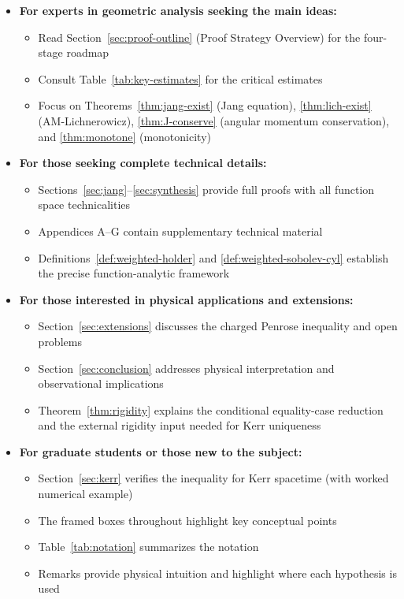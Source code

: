 \begin{itemize}[leftmargin=1.5em]
    \item \textbf{For experts in geometric analysis seeking the main ideas:}
    \begin{itemize}
        \item Read Section~\ref{sec:proof-outline} (Proof Strategy Overview) for the four-stage roadmap
        \item Consult Table~\ref{tab:key-estimates} for the critical estimates
        \item Focus on Theorems~\ref{thm:jang-exist} (Jang equation), \ref{thm:lich-exist} (AM-Lichnerowicz), \ref{thm:J-conserve} (angular momentum conservation), and \ref{thm:monotone} (monotonicity)
    \end{itemize}
    
    \item \textbf{For those seeking complete technical details:}
    \begin{itemize}
        \item Sections~\ref{sec:jang}--\ref{sec:synthesis} provide full proofs with all function space technicalities
        \item Appendices A--G contain supplementary technical material
        \item Definitions~\ref{def:weighted-holder} and \ref{def:weighted-sobolev-cyl} establish the precise function-analytic framework
    \end{itemize}
    
    \item \textbf{For those interested in physical applications and extensions:}
    \begin{itemize}
        \item Section~\ref{sec:extensions} discusses the charged Penrose inequality and open problems
        \item Section~\ref{sec:conclusion} addresses physical interpretation and observational implications
        \item Theorem~\ref{thm:rigidity} explains the conditional equality-case reduction and the external rigidity input needed for Kerr uniqueness
    \end{itemize}
    
    \item \textbf{For graduate students or those new to the subject:}
    \begin{itemize}
        \item Section~\ref{sec:kerr} verifies the inequality for Kerr spacetime (with worked numerical example)
        \item The framed boxes throughout highlight key conceptual points
        \item Table~\ref{tab:notation} summarizes the notation
        \item Remarks provide physical intuition and highlight where each hypothesis is used
    \end{itemize}
\end{itemize}


